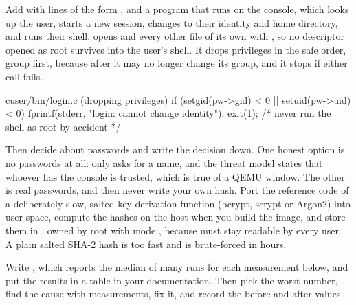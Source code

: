 \documentclass[11pt,a4paper]{article}
\begin{document}
Add  with lines of the form , and a  program that
 runs on the console, which looks up the user, starts a new session, changes to their identity and home
directory, and runs their shell.  opens  and every other file of its own with
, so no descriptor opened as root survives into the user's shell. It drops privileges in the safe
order, group first, because after  it may no longer change its group, and it stops if either call fails.

\begin{lst}{c}{user/bin/login.c (dropping privileges)}
if (setgid(pw->gid) < 0 || setuid(pw->uid) < 0) {
    fprintf(stderr, "login: cannot change identity\n");
    exit(1);                    /* never run the shell as root by accident */
}
\end{lst}

Then decide about passwords and write the decision down. One honest option is no passwords at all:  only
asks for a name, and the threat model states that whoever has the console is trusted, which is true of a QEMU window.
The other is real passwords, and then never write your own hash. Port the reference code of a deliberately slow,
salted key-derivation function (bcrypt, scrypt or Argon2) into user space, compute the hashes on the host when you
build the image, and store them in , owned by root with mode , because 
must stay readable by every user. A plain salted SHA-2 hash is too fast and is brute-forced in hours.

Write , which reports the median of many runs for each measurement below, and put the results in
a table in your documentation. Then pick the worst number, find the cause with measurements, fix it, and record the
before and after values.
\end{document}
